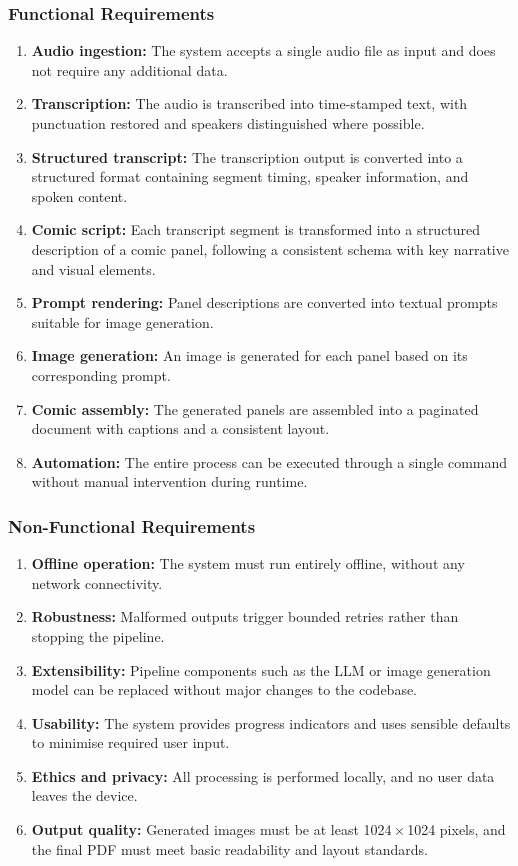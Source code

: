 \subsubsection{Functional Requirements}
\begin{enumerate}
  \item \textbf{Audio ingestion:} The system accepts a single audio file as input and does not require any additional data.
  \item \textbf{Transcription:} The audio is transcribed into time-stamped text, with punctuation restored and speakers distinguished where possible.
  \item \textbf{Structured transcript:} The transcription output is converted into a structured format containing segment timing, speaker information, and spoken content.
  \item \textbf{Comic script:} Each transcript segment is transformed into a structured description of a comic panel, following a consistent schema with key narrative and visual elements.
  \item \textbf{Prompt rendering:} Panel descriptions are converted into textual prompts suitable for image generation.
  \item \textbf{Image generation:} An image is generated for each panel based on its corresponding prompt.
  \item \textbf{Comic assembly:} The generated panels are assembled into a paginated document with captions and a consistent layout.
  \item \textbf{Automation:} The entire process can be executed through a single command without manual intervention during runtime.
\end{enumerate}

\subsubsection{Non-Functional Requirements}
\begin{enumerate}
  \item \textbf{Offline operation:} The system must run entirely offline, without any network connectivity.
  \item \textbf{Robustness:} Malformed outputs trigger bounded retries rather than stopping the pipeline.
  \item \textbf{Extensibility:} Pipeline components such as the LLM or image generation model can be replaced without major changes to the codebase.
  \item \textbf{Usability:} The system provides progress indicators and uses sensible defaults to minimise required user input.
  \item \textbf{Ethics and privacy:} All processing is performed locally, and no user data leaves the device.
  \item \textbf{Output quality:} Generated images must be at least 1024\,$\times$\,1024 pixels, and the final PDF must meet basic readability and layout standards.
\end{enumerate}

